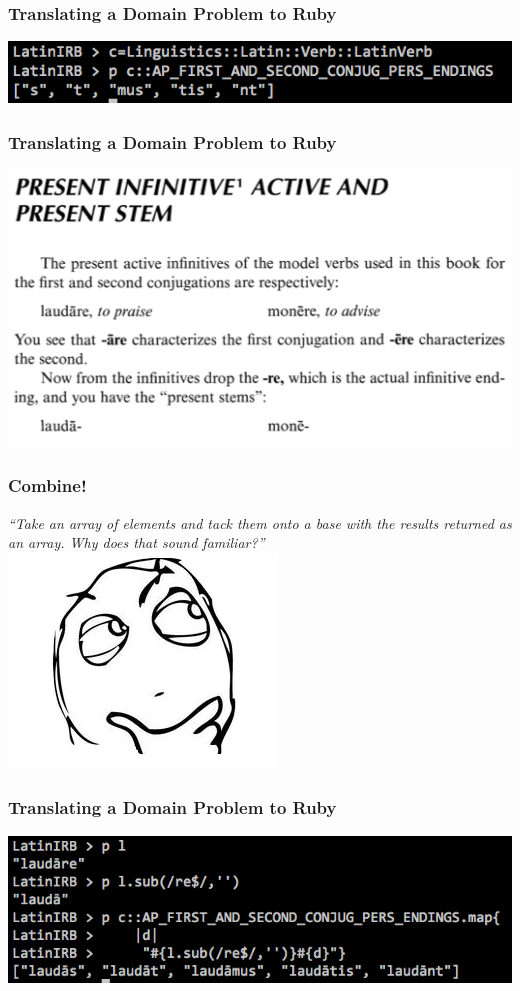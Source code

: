 \documentclass[slidestop,compress,mathserif,notes]{beamer}
\begin{document}
\begin{frame}
	\frametitle{Translating a Domain Problem to Ruby} 
	\includegraphics[scale=0.45]{img/conj_how_1b.png}
\end{frame}

\begin{frame}
	\frametitle{Translating a Domain Problem to Ruby} 
	\includegraphics[scale=0.45]{img/conj_how_2.png}
\end{frame}

\begin{frame}
	\frametitle{Combine!}
	\emph{``Take an array of elements and tack them onto a base with the results
returned as an array. Why does that sound familiar?''}
	\includegraphics[scale=0.45]{img/determined.png}
\end{frame}

\begin{frame}
	\frametitle{Translating a Domain Problem to Ruby} 
	\vskip 1.0cm
	\begin{center}
		\includegraphics[scale=0.45]{img/conj_how_2b.png}	
	\end{center}
\end{frame}
\end{document}
